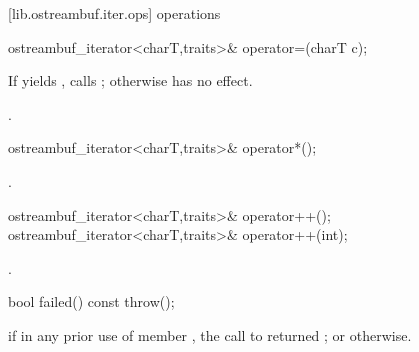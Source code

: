 [lib.ostreambuf.iter.ops]{ operations}

%
\begin{itemdecl}
ostreambuf_iterator<charT,traits>&
  operator=(charT c);
\end{itemdecl}

\begin{itemdescr}
\pnum
\effects
If
yields
,
calls
;
otherwise has no effect.

\pnum
\returns
{}.
\end{itemdescr}

%
\begin{itemdecl}
ostreambuf_iterator<charT,traits>& operator*();
\end{itemdecl}

\begin{itemdescr}
\pnum
\returns
{}.
\end{itemdescr}

%
\begin{itemdecl}
ostreambuf_iterator<charT,traits>& operator++();
ostreambuf_iterator<charT,traits>& operator++(int);
\end{itemdecl}

\begin{itemdescr}
\pnum
\returns
{}.
\end{itemdescr}

%
\begin{itemdecl}
bool failed() const throw();
\end{itemdecl}

\begin{itemdescr}
\pnum
\returns
{}
if in any prior use of member
,
the call to
returned
;
or
otherwise.
\end{itemdescr}

